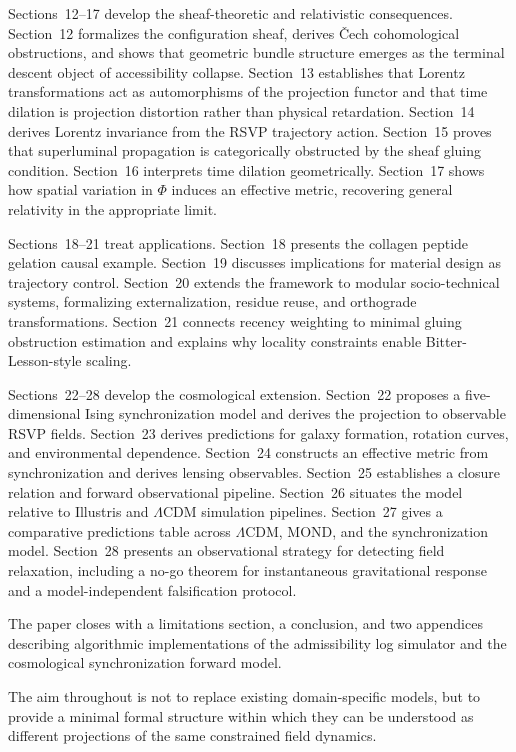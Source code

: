 \documentclass[11pt, a4paper, twocolumn]{article}
\begin{document}
Sections~12--17 develop the sheaf-theoretic and relativistic consequences.
Section~12 formalizes the configuration sheaf, derives \v{C}ech cohomological
obstructions, and shows that geometric bundle structure emerges as the terminal
descent object of accessibility collapse. Section~13 establishes that Lorentz
transformations act as automorphisms of the projection functor and that time
dilation is projection distortion rather than physical retardation. Section~14
derives Lorentz invariance from the RSVP trajectory action. Section~15 proves
that superluminal propagation is categorically obstructed by the sheaf gluing
condition. Section~16 interprets time dilation geometrically. Section~17 shows
how spatial variation in $\Phi$ induces an effective metric, recovering
general relativity in the appropriate limit.

Sections~18--21 treat applications. Section~18 presents the collagen peptide
gelation causal example. Section~19 discusses implications for material design as
trajectory control. Section~20 extends the framework to modular socio-technical
systems, formalizing externalization, residue reuse, and orthograde
transformations. Section~21 connects recency weighting to minimal gluing
obstruction estimation and explains why locality constraints enable
Bitter-Lesson-style scaling.

Sections~22--28 develop the cosmological extension. Section~22 proposes a
five-dimensional Ising synchronization model and derives the projection to
observable RSVP fields. Section~23 derives predictions for galaxy formation,
rotation curves, and environmental dependence. Section~24 constructs an effective
metric from synchronization and derives lensing observables. Section~25
establishes a closure relation and forward observational pipeline. Section~26
situates the model relative to Illustris and $\Lambda$CDM simulation pipelines.
Section~27 gives a comparative predictions table across $\Lambda$CDM, MOND, and
the synchronization model. Section~28 presents an observational strategy for
detecting field relaxation, including a no-go theorem for instantaneous
gravitational response and a model-independent falsification protocol.

The paper closes with a limitations section, a conclusion, and two appendices
describing algorithmic implementations of the admissibility log simulator and the
cosmological synchronization forward model.

The aim throughout is not to replace existing domain-specific models, but to
provide a minimal formal structure within which they can be understood as
different projections of the same constrained field dynamics.
\end{document}
